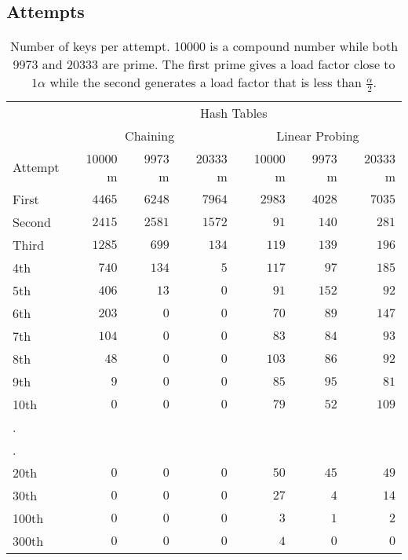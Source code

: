 \documentclass[a4paper, 11pt]{article}
\begin{document}
    \subsection*{Attempts}
    \begin{table}[h]
        \centering
        \small
\begin{tabular}{lrrrrrr}
\toprule
& \multicolumn{6}{c}{Hash Tables}\\
\cmidrule(lr){2-7}
& \multicolumn{3}{c}{Chaining} &\multicolumn{3}{c}{Linear Probing}\\
\cmidrule(lr){2-4}
\cmidrule(lr){5-7}
Attempt & \num{10000} m & \num{9973} m & \num{20333} m & \num{10000} m & \num{9973} m & \num{20333} m \\
\cmidrule(lr){1-1}
\cmidrule(lr){2-7}
First & $4465$ & $6248$ & $7964$ & $2983$ & $4028$ & $7035$\\
Second & $2415$ & $2581$ & $1572$ & $91$ & $140$ & $281$\\
Third & $1285$ & $699$ & $134$ & $119$ & $139$ & $196$\\
4th & $740$ & $134$ & $5$ & $117$ & $97$ & $185$\\
5th & $406$ & $13$ & $0$ & $91$ & $152$ & $92$\\
6th & $203$ & $0$ & $0$ & $70$ & $89$ & $147$\\
7th & $104$ & $0$ & $0$ & $83$ & $84$ & $93$\\
8th & $48$ & $0$ & $0$ & $103$ & $86$ & $92$\\
9th & $9$ & $0$ & $0$ & $85$ & $95$ & $81$\\
10th & $0$ & $0$ & $0$ & $79$ & $52$ & $109$\\
\multicolumn{7}{l}{.}\\
\multicolumn{7}{l}{.}\\
20th & $0$ & $0$ & $0$ & $50$ & $45$ & $49$\\
30th & $0$ & $0$ & $0$ & $27$ & $4$ & $14$\\
100th & $0$ & $0$ & $0$ & $3$ & $1$ & $2$\\
300th & $0$ & $0$ & $0$ & $4$ & $0$ & $0$\\

\bottomrule
\end{tabular}
    \caption{Number of keys per attempt. \num{10000} is a compound number while both \num{9973} and \num{20333} 
    are prime. The first prime gives a load factor close to $1 \alpha$
    while the second generates a load factor that is less than $\frac{\alpha}{2}$.
    } %
    \label{tab:attempts} %
    \end{table}
\end{document}
